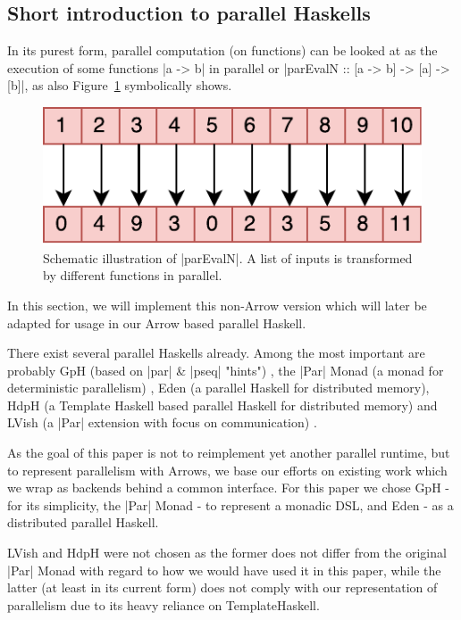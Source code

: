 \subsection{Short introduction to parallel Haskells}
\label{sec:parEvalNIntro}
In its purest form, parallel computation (on functions) can be looked at as the execution of some functions |a -> b| in parallel or |parEvalN :: [a -> b] -> [a] -> [b]|, as also Figure~\ref{fig:parEvalN} symbolically shows.
\begin{figure}[t]
  \centering
	\includegraphics[scale=0.7]{images/parEvalN}
	\caption{Schematic illustration of |parEvalN|. A list of inputs is transformed by different functions in parallel.}
	\label{fig:parEvalN}
\end{figure}

In this section, we will implement this non-Arrow version which will later be adapted for usage in our Arrow based parallel Haskell.

There exist several parallel Haskells already. Among the most important are probably GpH  (based on |par| \& |pseq| "hints") \cite{Trinder1996,Trinder1998a}, the |Par| Monad (a monad for deterministic parallelism) \cite{par-monad,Foltzer:2012:MPC:2398856.2364562}, Eden \cite{eden,Loogen2012} (a parallel Haskell for distributed memory), HdpH (a Template Haskell based parallel Haskell for distributed memory) \cite{Maier:2014:HDS:2775050.2633363,stewart_maier_trinder_2016} and LVish (a |Par| extension with focus on communication) \cite{Kuper:2014:TPE:2666356.2594312}.

As the goal of this paper is not to reimplement yet another parallel runtime, but to represent parallelism with Arrows, we base our efforts on existing work which we wrap as backends behind a common interface. For this paper we chose GpH - for its simplicity, the |Par| Monad - to represent a monadic DSL, and Eden - as a distributed parallel Haskell.

LVish and HdpH were not chosen as the former does not differ from the original |Par| Monad with regard to how we would have used it in this paper, while the latter (at least in its current form) does not comply with our representation of parallelism due to its heavy reliance on TemplateHaskell.

